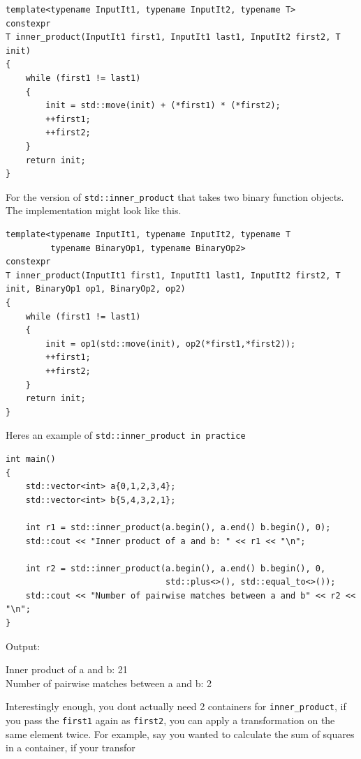 \documentclass{report}
\begin{document}
\begin{verbatim}
template<typename InputIt1, typename InputIt2, typename T>
constexpr 
T inner_product(InputIt1 first1, InputIt1 last1, InputIt2 first2, T init)
{
    while (first1 != last1)
    {
        init = std::move(init) + (*first1) * (*first2);
        ++first1;
        ++first2;
    }
    return init;
}
\end{verbatim}
For the version of \texttt{std::inner\_product} that takes two binary function objects. The implementation might look like this.
\begin{verbatim}
template<typename InputIt1, typename InputIt2, typename T
         typename BinaryOp1, typename BinaryOp2>
constexpr 
T inner_product(InputIt1 first1, InputIt1 last1, InputIt2 first2, T init, BinaryOp1 op1, BinaryOp2, op2)
{
    while (first1 != last1)
    {
        init = op1(std::move(init), op2(*first1,*first2));
        ++first1;
        ++first2;
    }
    return init;
}
\end{verbatim}
\newpage
Heres an example of \texttt{std::inner\_product in practice}
\begin{verbatim}
int main()
{
    std::vector<int> a{0,1,2,3,4};
    std::vector<int> b{5,4,3,2,1};

    int r1 = std::inner_product(a.begin(), a.end() b.begin(), 0);
    std::cout << "Inner product of a and b: " << r1 << "\n";

    int r2 = std::inner_product(a.begin(), a.end() b.begin(), 0, 
                                std::plus<>(), std::equal_to<>());
    std::cout << "Number of pairwise matches between a and b" << r2 << "\n";
}
\end{verbatim}
\noindent Output: 
\begin{mdframed}
Inner product of a and b: 21  \\
Number of pairwise matches between a and b: 2
\end{mdframed}
\noindent
Interestingly enough, you dont actually need 2 containers for \texttt{inner\_product}, if you pass the \texttt{first1} again as \texttt{first2}, you can apply a transformation on the same element twice. For example, say you wanted to calculate the sum of squares in a container, if your transfor
\end{document}
